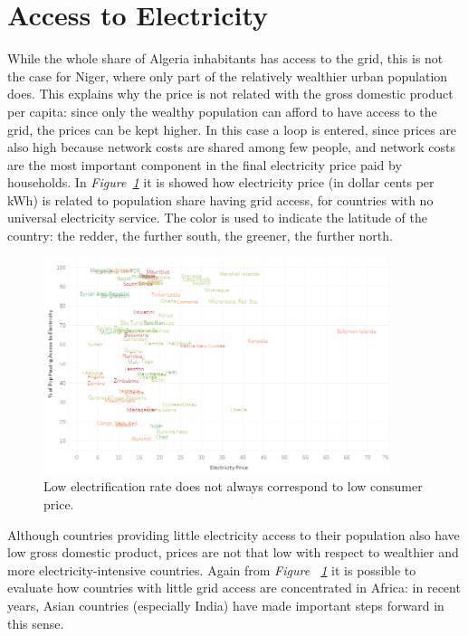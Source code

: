 \documentclass[a4paper,12pt]{book}
\begin{document}
\section{Access to Electricity}

While the whole share of Algeria inhabitants has access to the grid, this is not the case for Niger, where only part of the relatively wealthier urban population does. This explains why the price is not related with the gross domestic product per capita: since only the wealthy population can afford to have access to the grid, the prices can be kept higher. In this case a loop is entered, since prices are also high because network costs are shared among few people, and network costs are the most important component in the final electricity price paid by households. In \textit{Figure~\ref{fig:northsouth}} it is showed how electricity price (in dollar cents per kWh) is related to population share having grid access, for countries with no universal electricity service. The color is used to indicate the latitude of the country: the redder, the further south, the greener, the further north.

\begin{figure}[tb]
\begin{center}
\captionsetup{justification=centering}
\includegraphics[width=0.9\textwidth]{Images/accessNAMES.png}
\caption{Low electrification rate does not always correspond to low consumer price.}
\label{fig:northsouth}
\end{center}
\end{figure}

Although countries providing little electricity access to their population also have low gross domestic product, prices are not that low with respect to wealthier and more electricity-intensive countries. Again from \textit{Figure ~\ref{fig:northsouth}} it is possible to evaluate how countries with little grid access are concentrated in Africa: in recent years, Asian countries (especially India) have made important steps forward in this sense.
\end{document}
